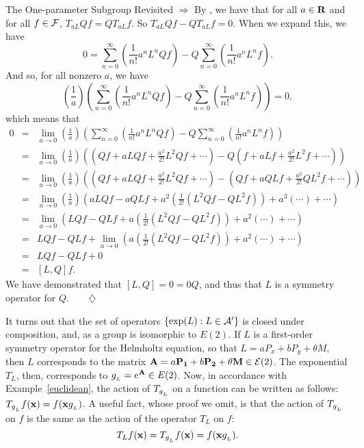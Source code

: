 \begin{section}{The One-parameter Subgroup Revisited}
\noindent {} $\Longrightarrow$   By , we have that for all $a \in \mathbf{R}$ and for all $f \in \mathcal{F}$, $T_{aL} Q f = Q T_{aL} f$.  So $T_{aL} Q f - Q T_{aL} f = 0$.  When we expand this, we have
\[
0 =  \sum_{n=0}^\infty \left( \frac{1}{n!} a^n L^n Q f \right) - Q \sum_{n=0}^\infty \left( \frac{1}{n!} a^n L^n f \right).
\]
And so, for all nonzero $a$, we have
\[
\left( \frac{1}{a} \right) \left( \sum_{n=0}^\infty \left( \frac{1}{n!} a^n L^n Q f \right) - Q \sum_{n=0}^\infty \left( \frac{1}{n!} a^n L^n f \right) \right) = 0,
\]
which means that
\begin{eqnarray*}
0	& = & \lim_{a \to 0} \left( \frac{1}{a} \right) \left( \sum_{n=0}^\infty \left( \frac{1}{n!} a^n L^n Q f \right) - Q \sum_{n=0}^\infty \left( \frac{1}{n!} a^n L^n f \right) \right) \\
	& = & \lim_{a \to 0} \left( \frac{1}{a} \right) \left( \left( Qf + a L Qf + \frac{a^2}{2!} L^2 Qf + \cdots \right) - Q \left( f + a L f + \frac{a^2}{2!} L^2 f + \cdots \right) \right) \\
	& = & \lim_{a \to 0} \left( \frac{1}{a} \right) \left( \left( Qf + a L Qf + \frac{a^2}{2!} L^2 Qf + \cdots \right) - \left( Qf + a Q L f + \frac{a^2}{2!} Q L^2 f + \cdots \right) \right) \\
	& = & \lim_{a \to 0} \left( \frac{1}{a} \right) \left( a L Qf - a Q L f + a^2 \left( \frac{1}{2!} \left( L^2 Qf - Q L^2 f \right) \right) + a^3(\cdots) + \cdots \right) \\
	& = & \lim_{a \to 0} \left( L Qf - Q L f + a \left( \frac{1}{2!} \left( L^2 Qf - Q L^2 f \right) \right) + a^2(\cdots) + \cdots \right) \\
	& = & L Q f - Q L f + \lim_{a \to 0} \left( a \left( \frac{1}{2!} \left( L^2 Qf - Q L^2 f \right) \right) + a^2 (\cdots) + \cdots \right) \\
	& = & L Q f - Q L f + 0 \\
	& = & [L,Q]f.
\end{eqnarray*}
We have demonstrated that $[L,Q] = 0 = 0 Q$, and thus that $L$ is a symmetry operator for $Q$.$\qquad \diamondsuit$

\eex

It turns out that the set of operators $\{ \exp(L): L \in \mathcal{A}^\prime \}$ is closed under composition, and, as a group is isomorphic to $E(2)$.  If $L$ is a first-order symmetry operator for the Helmholtz equation, so that $L = aP_x + bP_y + \theta M$, then $L$ corresponds to the matrix $\mathbf{A} = a \mathbf{P_1} + b \mathbf{P_2} + \theta \mathbf{M} \in \mathcal{E}(2)$.  The exponential $T_L$, then, corresponds to $g_{_L} = e^{\mathbf{A}} \in E(2)$.  Now, in accordance with Example~\ref{euclidean}, the action of $T_{g_{_L}}$ on a function can be written as follows: $T_{g_{_L}}f(\mathbf{x}) = f(\mathbf{x} g_{_L})$.  A useful fact, whose proof we omit, is that the action of $T_{g_{_L}}$ on $f$ is the same as the action of the operator $T_L$ on $f$:
\begin{equation}
\label{actonf}
T_L f(\mathbf{x}) = T_{g_{_L}}f(\mathbf{x}) = f(\mathbf{x} g_{_L}).
\end{equation}

\end{section}

